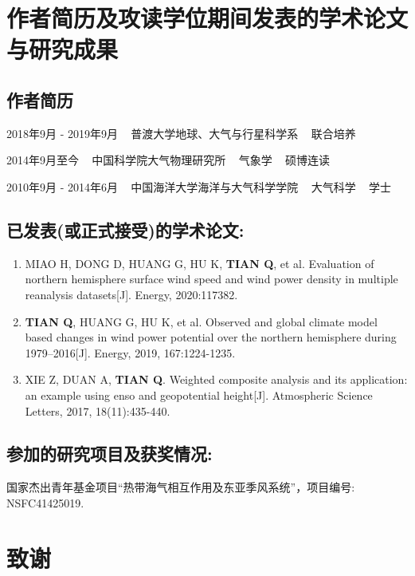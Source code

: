\chapter{作者简历及攻读学位期间发表的学术论文与研究成果}


\section*{作者简历}

2018年9月 - 2019年9月 ~ 普渡大学地球、大气与行星科学系 ~ 联合培养

2014年9月至今 ~ 中国科学院大气物理研究所 ~ 气象学 ~ 硕博连读

2010年9月 - 2014年6月 ~ 中国海洋大学海洋与大气科学学院 ~ 大气科学 ~ 学士


\section*{已发表(或正式接受)的学术论文:}

{
\setlist[enumerate]{}%
\begin{enumerate}[nosep]
    \item MIAO H, DONG D, HUANG G, HU K, \textbf{TIAN Q}, et al. Evaluation of northern hemisphere surface wind speed and wind power density in multiple reanalysis datasets[J]. Energy, 2020:117382.
    
    \item \textbf{TIAN Q}, HUANG G, HU K, et al. Observed and global climate model based changes in wind power potential over the northern hemisphere during 1979–2016[J]. Energy, 2019, 167:1224-1235.
    
    \item XIE Z, DUAN A, \textbf{TIAN Q}. Weighted composite analysis and its application: an example using enso and geopotential height[J]. Atmospheric Science Letters, 2017, 18(11):435-440.
\end{enumerate}
}


\section*{参加的研究项目及获奖情况:}

国家杰出青年基金项目“热带海气相互作用及东亚季风系统”，项目编号: NSFC41425019.

\chapter[致谢]{致\quad 谢}%
\thispagestyle{noheaderstyle}%

